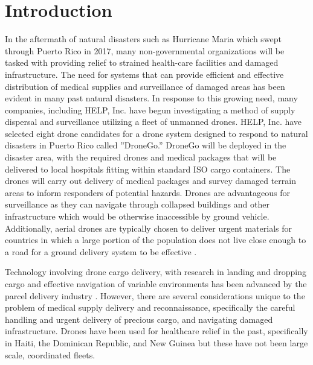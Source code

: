 \documentclass[twocolumn,10pt]{asme2ej}
\begin{document}


\section{Introduction}
In the aftermath of natural disasters such as Hurricane Maria which swept through Puerto Rico in 2017, many non-governmental organizations will be tasked with providing relief to strained health-care facilities and damaged infrastructure. The need for systems that can provide efficient and effective distribution of medical supplies and surveillance of damaged areas has been evident in many past natural disasters. In response to this growing need, many companies, including HELP, Inc. have begun investigating a method of supply dispersal and surveillance utilizing a fleet of unmanned drones. HELP, Inc. have selected eight drone candidates for a drone system designed to respond to natural disasters in Puerto Rico called ”DroneGo.” DroneGo will be deployed in the disaster area, with the required drones and medical packages that will be delivered to local hospitals fitting within standard ISO cargo containers. The drones will carry out delivery of medical packages and survey damaged terrain areas to inform responders of potential hazards. Drones are advantageous for surveillance as they can navigate through collapsed buildings and other infrastructure which would be otherwise inaccessible by ground vehicle. Additionally, aerial drones are typically chosen to deliver urgent materials for countries in which a large portion of the population does not live close enough to a road for a ground delivery system to be effective \cite{Scott}.

Technology involving drone cargo delivery, with research in landing and dropping cargo and effective navigation of variable environments has been advanced by the parcel delivery industry \cite{Funabashi}. However, there are several considerations unique to the problem of medical supply delivery and reconnaissance, specifically the careful handling and urgent delivery of precious cargo, and navigating damaged infrastructure. Drones have been used for healthcare relief in the past, specifically in Haiti, the Dominican Republic, and New Guinea \cite{Scott}\cite{Otero} but these have not been large scale, coordinated fleets.
\end{document}
